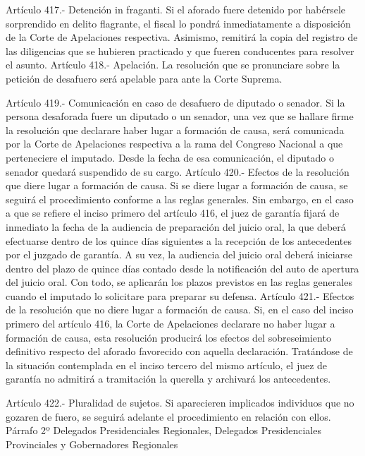     Artículo 417.- Detención in fraganti. Si el aforado fuere detenido por habérsele sorprendido en delito flagrante, el fiscal lo pondrá inmediatamente a disposición de la Corte de Apelaciones respectiva. Asimismo, remitirá la copia del registro de las diligencias que se hubieren practicado y que fueren conducentes para resolver el asunto.
    Artículo 418.- Apelación. La resolución que se pronunciare sobre la petición de desafuero será apelable para ante la Corte Suprema.

    Artículo 419.- Comunicación en caso de desafuero de diputado o senador. Si la persona desaforada fuere un diputado o un senador, una vez que se hallare firme la resolución que declarare haber lugar a formación de causa, será comunicada por la Corte de Apelaciones respectiva a la rama del Congreso Nacional a que perteneciere el imputado. Desde la fecha de esa comunicación, el diputado o senador quedará suspendido de su cargo.
    Artículo 420.- Efectos de la resolución que diere lugar a formación de causa. Si se diere lugar a formación de causa, se seguirá el procedimiento conforme a las reglas generales.
    Sin embargo, en el caso a que se refiere el inciso primero del artículo 416, el juez de garantía fijará de inmediato la fecha de la audiencia de preparación del juicio oral, la que deberá efectuarse dentro de los quince días siguientes a la recepción de los antecedentes por el juzgado de garantía. A su vez, la audiencia del juicio oral deberá iniciarse dentro del plazo de quince días contado desde la notificación del auto de apertura del juicio oral. Con todo, se aplicarán los plazos previstos en las reglas generales cuando el imputado lo solicitare para preparar su defensa.
    Artículo 421.- Efectos de la resolución que no diere lugar a formación de causa. Si, en el caso del inciso primero del artículo 416, la Corte de Apelaciones declarare no haber lugar a formación de causa, esta resolución producirá los efectos del sobreseimiento definitivo respecto del aforado favorecido con aquella declaración.
    Tratándose de la situación contemplada en el inciso tercero del mismo artículo, el juez de garantía no admitirá a tramitación la querella y archivará los antecedentes.

    Artículo 422.- Pluralidad de sujetos. Si aparecieren implicados individuos que no gozaren de fuero, se seguirá adelante el procedimiento en relación con ellos.
    Párrafo 2º Delegados Presidenciales Regionales, Delegados Presidenciales Provinciales y Gobernadores Regionales



